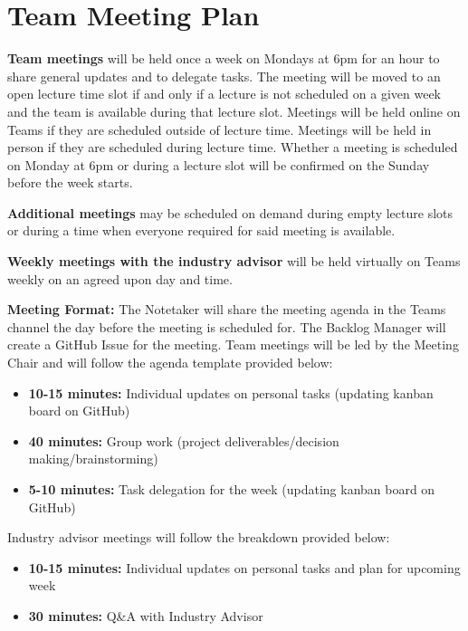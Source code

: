 \documentclass{article}
\begin{document}

\section{Team Meeting Plan}
\textbf{Team meetings} will be held once a week on Mondays at 6pm for an hour to share general updates and to delegate tasks. The meeting will be moved to an open lecture time slot if and only if a lecture is not scheduled on a given week and the team is available during that lecture slot. Meetings will be held online on Teams if they are scheduled outside of lecture time. Meetings will be held in person if they are scheduled during lecture time. Whether a meeting is scheduled on Monday at 6pm or during a lecture slot will be confirmed on the Sunday before the week starts.

\vspace{1em}

\noindent \textbf{Additional meetings} may be scheduled on demand during empty lecture slots or during a time when everyone required for said meeting is available.

\vspace{1em}

\noindent \textbf{Weekly meetings with the industry advisor} will be held virtually on Teams weekly on an agreed upon day and time. 

\vspace{1em}

\noindent \textbf{Meeting Format:}
The Notetaker will share the meeting agenda in the Teams channel the day before the meeting is scheduled for. The Backlog Manager will create a GitHub Issue for the meeting. Team meetings will be led by the Meeting Chair and will follow the agenda template provided below:
\begin{itemize}
  \item \textbf{10-15 minutes:} Individual updates on personal tasks (updating kanban board on GitHub)
  \item \textbf{40 minutes:} Group work (project deliverables/decision making/brainstorming)
  \item \textbf{5-10 minutes:} Task delegation for the week (updating kanban board on GitHub)
\end{itemize}

\noindent Industry advisor meetings will follow the breakdown provided below:
\begin{itemize}
  \item \textbf{10-15 minutes:} Individual updates on personal tasks and plan for upcoming week
  \item \textbf{30 minutes:} Q\&A with Industry Advisor
\end{itemize}
\end{document}

